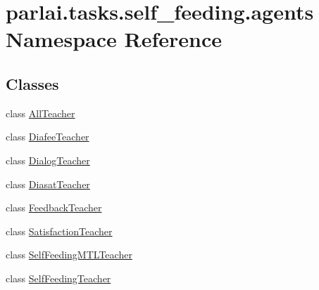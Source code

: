\hypertarget{namespaceparlai_1_1tasks_1_1self__feeding_1_1agents}{}\section{parlai.\+tasks.\+self\+\_\+feeding.\+agents Namespace Reference}
\label{namespaceparlai_1_1tasks_1_1self__feeding_1_1agents}
\subsection*{Classes}
\begin{DoxyCompactItemize}
\item 
class \hyperlink{classparlai_1_1tasks_1_1self__feeding_1_1agents_1_1AllTeacher}{All\+Teacher}
\item 
class \hyperlink{classparlai_1_1tasks_1_1self__feeding_1_1agents_1_1DiafeeTeacher}{Diafee\+Teacher}
\item 
class \hyperlink{classparlai_1_1tasks_1_1self__feeding_1_1agents_1_1DialogTeacher}{Dialog\+Teacher}
\item 
class \hyperlink{classparlai_1_1tasks_1_1self__feeding_1_1agents_1_1DiasatTeacher}{Diasat\+Teacher}
\item 
class \hyperlink{classparlai_1_1tasks_1_1self__feeding_1_1agents_1_1FeedbackTeacher}{Feedback\+Teacher}
\item 
class \hyperlink{classparlai_1_1tasks_1_1self__feeding_1_1agents_1_1SatisfactionTeacher}{Satisfaction\+Teacher}
\item 
class \hyperlink{classparlai_1_1tasks_1_1self__feeding_1_1agents_1_1SelfFeedingMTLTeacher}{Self\+Feeding\+M\+T\+L\+Teacher}
\item 
class \hyperlink{classparlai_1_1tasks_1_1self__feeding_1_1agents_1_1SelfFeedingTeacher}{Self\+Feeding\+Teacher}
\end{DoxyCompactItemize}
